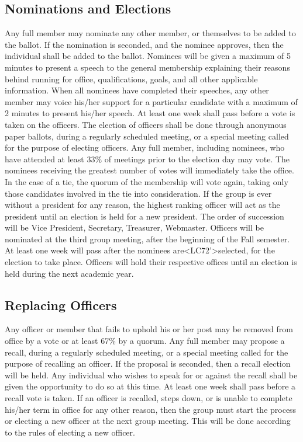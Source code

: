 \documentclass{article}
\begin{document}
\subsection{Nominations and Elections}
Any full member may nominate any other member, or themselves to be added to the ballot.  If the nomination is seconded, and the nominee approves, then the individual shall be added to the ballot. Nominees will be given a maximum of 5 minutes to present a speech to the general membership explaining their reasons behind running for office, qualifications, goals, and all other applicable information. When all nominees have completed their speeches, any other member may voice his/her support for a particular candidate with a maximum of 2 minutes to present his/her speech.  At least one week shall pass before a vote is taken on the officers. The election of officers shall be done through anonymous paper ballots, during a regularly scheduled meeting, or a special meeting called for the purpose of electing officers.  Any full member, including nominees, who have attended at least 33\% of meetings prior to the election day may vote.  The nominees receiving the greatest number of votes will immediately take the office. In the case of a tie, the quorum of the membership will vote again, taking only those candidates involved in the tie into consideration. If the group is ever without a president for any reason, the highest ranking officer will act as the president until an election is held for a new president.  The order of succession will be Vice President, Secretary, Treasurer, Webmaster. Officers will be nominated at the third group meeting, after the beginning of the Fall semester.  At least one week will pass after the nominees are<LC72'>selected, for the election to take place.  Officers will hold their respective offices until an election is held during the next academic year.

\subsection{Replacing Officers}
Any officer or member that fails to uphold his or her post may be removed from office by a vote or at least 67\% by a quorum.  Any full member may propose a recall, during a regularly scheduled meeting, or a special meeting called for the purpose of recalling an officer.  If the proposal is seconded, then a recall election will be held.  Any individual who wishes to speak for or against the recall shall be given the opportunity to do so at this time. At least one week shall pass before a recall vote is taken.
If an officer is recalled, steps down, or is unable to complete his/her term in office for any other reason, then the group must start the process or electing a new officer at the next group meeting.  This will be done according to the rules of electing a new officer.
\end{document}
